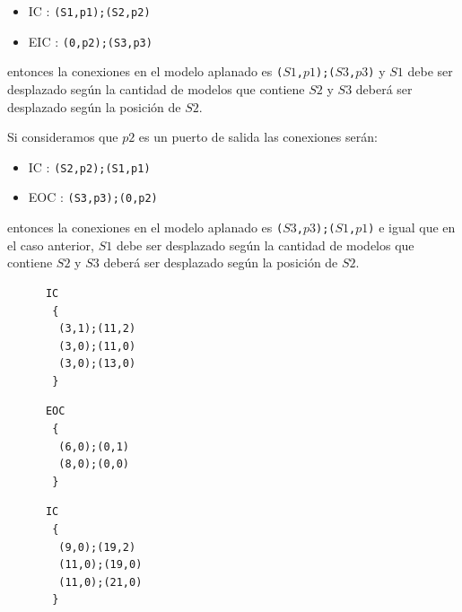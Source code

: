 \documentclass{beamer}
\begin{document}
\begin{frame}
	\begin{itemize}
	\item IC : \texttt{(S1,p1);(S2,p2)}
	\item EIC : \texttt{(0,p2);(S3,p3)}
	\end{itemize}

	entonces la conexiones en el modelo aplanado es \texttt{($S1$,$p1$);($S3$,$p3$)} y $S1$ debe ser desplazado según la cantidad de modelos que contiene $S2$ y 
	$S3$ deberá ser desplazado según la posición de $S2$.

	Si consideramos que $p2$ es un puerto de salida las conexiones serán:

	\begin{itemize}
	\item IC : \texttt{(S2,p2);(S1,p1)}
	\item EOC : \texttt{(S3,p3);(0,p2)}
	\end{itemize}

	entonces la conexiones en el modelo aplanado es \texttt{($S3$,$p3$);($S1$,$p1$)} e igual que en el caso anterior, $S1$ debe ser desplazado según la 
	cantidad de modelos que contiene $S2$ y $S3$ deberá ser desplazado según la posición de $S2$.
\end{frame}

\begin{frame}[fragile]
\begin{minipage}[t]{0.3\linewidth}
\begin{verbatim}
      IC
       {
        (3,1);(11,2)
        (3,0);(11,0)
        (3,0);(13,0)
       }
\end{verbatim}
\end{minipage}
\begin{minipage}[t]{0.3\linewidth}
\begin{verbatim}
      EOC
       {
        (6,0);(0,1)
        (8,0);(0,0)
       }
\end{verbatim}
\end{minipage}
\begin{minipage}[t]{0.3\linewidth}
\begin{verbatim}
      IC
       {
        (9,0);(19,2)
        (11,0);(19,0)
        (11,0);(21,0)
       }
\end{verbatim}
\end{minipage}
\end{frame}
\end{document}
